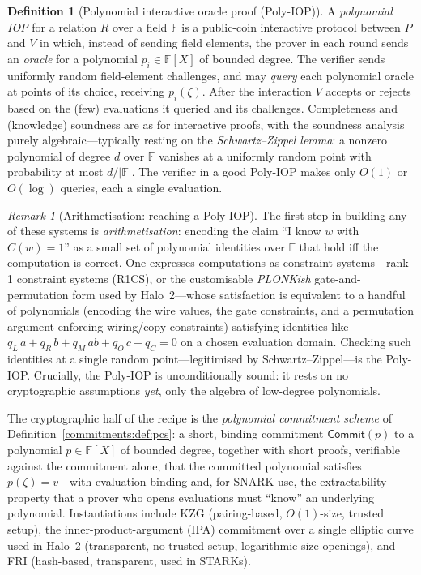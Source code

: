 \documentclass[11pt,a4paper]{article}
\theoremstyle{definition}
\newtheorem{definition}[theorem]{Definition}
\theoremstyle{remark}
\newtheorem{remark}[theorem]{Remark}
\newcommand{\F}{\ensuremath{\mathbb{F}}}
\begin{document}
\begin{definition}[Polynomial interactive oracle proof (Poly-IOP)]\label{zk:def:polyiop}
A \emph{polynomial IOP} for a relation \(R\) over a field \(\F\) is a public-coin interactive protocol between \(P\) and \(V\) in which, instead of sending field elements, the prover in each round sends an \emph{oracle} for a polynomial \(p_i \in \F[X]\) of bounded degree. The verifier sends uniformly random field-element challenges, and may \emph{query} each polynomial oracle at points of its choice, receiving \(p_i(\zeta)\). After the interaction \(V\) accepts or rejects based on the (few) evaluations it queried and its challenges. Completeness and (knowledge) soundness are as for interactive proofs, with the soundness analysis purely algebraic---typically resting on the \emph{Schwartz--Zippel lemma}: a nonzero polynomial of degree \(d\) over \(\F\) vanishes at a uniformly random point with probability at most \(d/|\F|\). The verifier in a good Poly-IOP makes only \(O(1)\) or \(O(\log)\) queries, each a single evaluation.
\end{definition}

\begin{remark}[Arithmetisation: reaching a Poly-IOP]\label{zk:rem:arithmetisation}
The first step in building any of these systems is \emph{arithmetisation}: encoding the claim ``I know \(w\) with \(C(w)=1\)'' as a small set of polynomial identities over \(\F\) that hold iff the computation is correct. One expresses computations as constraint systems---rank-1 constraint systems (R1CS), or the customisable \emph{PLONKish} gate-and-permutation form used by Halo~2---whose satisfaction is equivalent to a handful of polynomials (encoding the wire values, the gate constraints, and a permutation argument enforcing wiring/copy constraints) satisfying identities like \(q_L\, a + q_R\, b + q_M\, ab + q_O\, c + q_C = 0\) on a chosen evaluation domain. Checking such identities at a single random point---legitimised by Schwartz--Zippel---is the Poly-IOP. Crucially, the Poly-IOP is unconditionally sound: it rests on no cryptographic assumptions \emph{yet}, only the algebra of low-degree polynomials.
\end{remark}

The cryptographic half of the recipe is the \emph{polynomial commitment scheme} of Definition~\ref{commitments:def:pcs}: a short, binding commitment \(\mathsf{Commit}(p)\) to a polynomial \(p \in \F[X]\) of bounded degree, together with short proofs, verifiable against the commitment alone, that the committed polynomial satisfies \(p(\zeta) = v\)---with evaluation binding and, for SNARK use, the extractability property that a prover who opens evaluations must ``know'' an underlying polynomial. Instantiations include KZG (pairing-based, \(O(1)\)-size, trusted setup), the inner-product-argument (IPA) commitment over a single elliptic curve used in Halo~2 (transparent, no trusted setup, logarithmic-size openings), and FRI (hash-based, transparent, used in STARKs).
\end{document}
